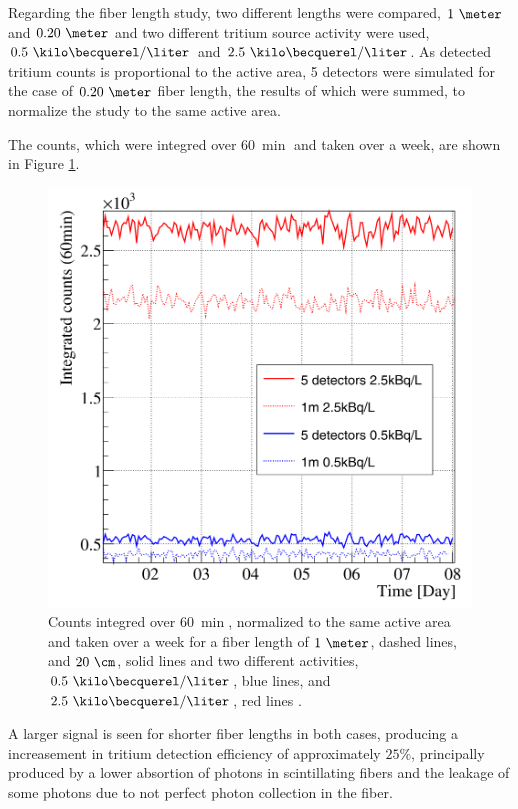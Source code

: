 Regarding the fiber length study, two different lengths were compared, $1~\meter$ and $0.20~\meter$ and two different tritium source activity were used, $0.5~\kilo\becquerel/\liter$ and $2.5~\kilo\becquerel/\liter$. As detected tritium counts is proportional to the active area, 5 detectors were simulated for the case of $0.20~\meter$ fiber length, the results of which were summed, to normalize the study to the same active area.

The counts, which were integred over $60~\min$ and taken over a week, are shown in Figure \ref{fig:CountsOver60minDifferentLength}.

\begin{figure}[h]
\centering
\includegraphics[scale=0.3]{Figures/8SimulationsResults/81TRITIUMDesign/813Length/2DifferentLength.png}
\caption{Counts integred over $60~\min$, normalized to the same active area and taken over a week for a fiber length of $1~\meter$, dashed lines, and $20~\cm$, solid lines and two different activities, $0.5~\kilo\becquerel/\liter$, blue lines, and $2.5~\kilo\becquerel/\liter$, red lines \cite{SimulationPaperCarlos}. \label{fig:CountsOver60minDifferentLength}}
\end{figure}

A larger signal is seen for shorter fiber lengths in both cases, producing a increasement in tritium detection efficiency of approximately $25\%$, principally produced by a lower absortion of photons in scintillating fibers and the leakage of some photons due to not perfect photon collection in the fiber.